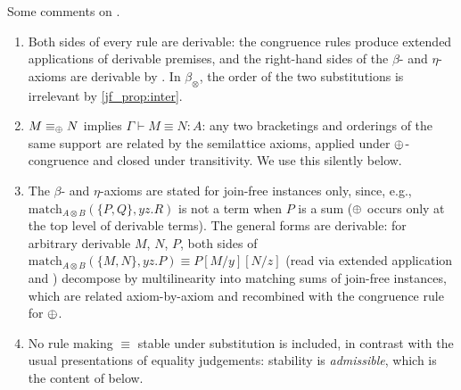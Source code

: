 \begin{remark}
\label{remark:slat_equality}
Some comments on .
\begin{enumerate}
  \item Both sides of every rule are derivable: the congruence rules produce extended applications of derivable premises, and the right-hand sides of the $\beta$- and $\eta$-axioms are derivable by .
  In $\beta_{\otimes}$, the order of the two substitutions is irrelevant by \ref{jf_prop:inter}.
  \item $M \equiv_{\mathbin{\oplus}} N$ implies $\Gamma \vdash M \equiv N : A$: any two bracketings and orderings of the same support are related by the semilattice axioms, applied under $\mathbin{\oplus}$-congruence and closed under transitivity.
  We use this silently below.
  \item The $\beta$- and $\eta$-axioms are stated for join-free instances only, since, e.g., $\text{match}_{A \otimes B}(\{P, Q\}, yz.R)$ is not a term when $P$ is a sum ($\mathbin{\oplus}$ occurs only at the top level of derivable terms).
  The general forms are derivable: for arbitrary derivable $M$, $N$, $P$, both sides of $\text{match}_{A \otimes B}(\{M, N\}, yz.P) \equiv P[M/y][N/z]$ (read via extended application and ) decompose by multilinearity into matching sums of join-free instances, which are related axiom-by-axiom and recombined with the congruence rule for $\mathbin{\oplus}$.
  \item No rule making $\equiv$ stable under substitution is included, in contrast with the usual presentations of equality judgements: stability is \emph{admissible}, which is the content of  below.
\end{enumerate}
\end{remark}

